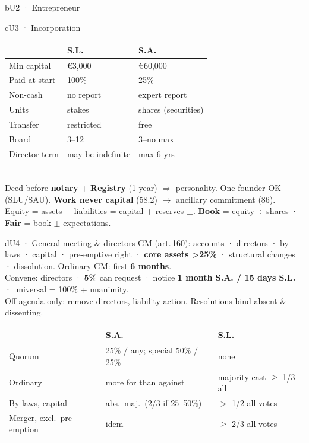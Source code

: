 \documentclass[9pt]{extarticle}
\newcommand{\col}[2]{\begin{minipage}[t]{#1\linewidth}\vspace{0pt}#2\end{minipage}}
\begin{document}
{\begin{bx}{b}{U2 · Entrepreneur}
\end{bx}
\begin{bx}{c}{U3 · Incorporation}
\begin{tabularx}{\linewidth}{@{}l X X@{}}\toprule & \textbf{S.L.} & \textbf{S.A.}\\\midrule
Min capital & €3,000 & €60,000\\ Paid at start & 100\% & 25\%\\ Non-cash & no report & expert report\\
Units & stakes & shares (securities)\\ Transfer & restricted & free\\ Board & 3--12 & 3--no max\\ Director term & may be indefinite & max 6 yrs\\\bottomrule\end{tabularx}\\[1mm]
Deed before \textbf{notary} + \textbf{Registry} (1 year) $\Rightarrow$ personality. One founder OK (SLU/SAU). \textbf{Work never capital} (58.2) $\rightarrow$ ancillary commitment (86).\\
Equity = assets $-$ liabilities = capital + reserves $\pm$. \textbf{Book} = equity $\div$ shares · \textbf{Fair} = book $\pm$ expectations.
\end{bx}
}\hfill\col{0.49}{
\begin{bx}{d}{U4 · General meeting \& directors}
GM (art.\,160): accounts · directors · by-laws · capital · pre-emptive right · \textbf{core assets >25\%} · structural changes · dissolution. Ordinary GM: first \textbf{6 months}.\\
Convene: directors · \textbf{5\%} can request · notice \textbf{1 month S.A. / 15 days S.L.} · universal = 100\% + unanimity.\\
Off-agenda only: remove directors, liability action. Resolutions bind absent \& dissenting.\\[0.5mm]
\begin{tabularx}{\linewidth}{@{}l X X@{}}\toprule & \textbf{S.A.} & \textbf{S.L.}\\\midrule
Quorum & 25\% / any; special 50\% / 25\% & none\\ Ordinary & more for than against & majority cast $\geq$ 1/3 all\\ By-laws, capital & abs.\ maj.\ (2/3 if 25--50\%) & $>$ 1/2 all votes\\ Merger, excl.\ pre-emption & idem & $\geq$ 2/3 all votes\\\bottomrule\end{tabularx}\\[0.5mm]

\end{bx}}
\end{document}
